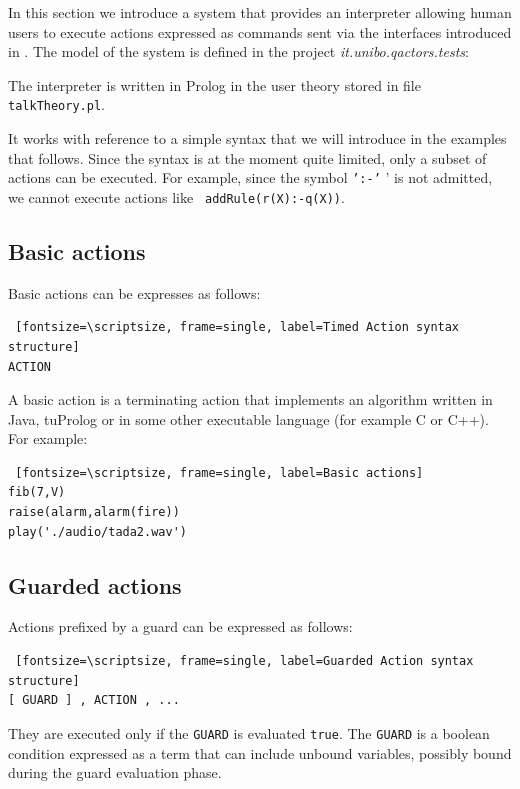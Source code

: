In this section we introduce a system that provides an interpreter allowing human users to execute actions expressed as commands sent via the interfaces introduced in .
The model of the system is defined in the project \textit{it.unibo.qactors.tests}:



The interpreter is written in Prolog in the user theory stored in file \texttt{talkTheory.pl}.

It works with reference to a simple syntax that we will introduce in the examples that follows. Since the syntax is at the moment quite limited, only a subset of actions can be executed.  For example, since the symbol \texttt{':-'} ' is not admitted, we cannot execute actions like \texttt{ addRule(r(X):-q(X))}.

\subsection{Basic actions}


Basic actions can be expresses as follows:
\begin{Verbatim} [fontsize=\scriptsize, frame=single, label=Timed Action syntax structure]
ACTION 
\end{Verbatim}

A basic action is a terminating action that implements an algorithm written in Java, tuProlog or in some other executable language (for example C or C++). 
For example:

\begin{Verbatim} [fontsize=\scriptsize, frame=single, label=Basic actions]
fib(7,V)
raise(alarm,alarm(fire))
play('./audio/tada2.wav')
\end{Verbatim}


\subsection{Guarded actions}

Actions prefixed by a guard can be expressed as follows:
\begin{Verbatim} [fontsize=\scriptsize, frame=single, label=Guarded Action syntax structure]
[ GUARD ] , ACTION , ... 
\end{Verbatim}

They are executed only if the \texttt{GUARD} is evaluated \texttt{true}. The \texttt{GUARD} is a boolean condition expressed as a \prolog{} term that can include unbound variables, possibly bound during the guard evaluation phase.
%

